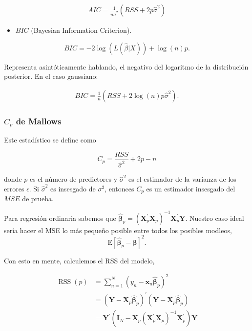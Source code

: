 \documentclass[
  12pt,
]{book}
\providecommand{\tightlist}{%
  \setlength{\itemsep}{0pt}\setlength{\parskip}{0pt}}
\theoremstyle{definition}
\theoremstyle{definition}
\theoremstyle{definition}
\theoremstyle{definition}
\theoremstyle{remark}
\begin{document}
\begin{align*}
AIC = \frac{1}{n\hat \sigma^2}(RSS+2p\hat \sigma^2)
\end{align*}

\begin{itemize}
\tightlist
\item
  \(BIC\) (Bayesian Information Criterion).
\end{itemize}

\[
BIC = -2\log(L(\hat{\beta} \vert X)) + \log(n)p. 
\]

Representa asintóticamente hablando, el negativo del logaritmo de la distribución posterior. En el caso gaussiano:

\begin{align*}
BIC = \frac{1}{n}(RSS+2\log (n)p\hat \sigma^2).
\end{align*}

\hypertarget{c_p-de-mallows-1}{%
\subsubsection{\texorpdfstring{\(C_p\) de Mallows}{C\_p de Mallows}}\label{c_p-de-mallows-1}}

Este estadístico se define como

\[ C_p = \dfrac{RSS}{\hat\sigma^2} + 2p-n \]

donde \(p\) es el número de predictores y \(\hat\sigma^2\) es el estimador de la varianza de los errores \(\epsilon\). Si \(\hat\sigma^2\) es insesgado de \(\sigma^2\), entonces \(C_p\) es un estimador insesgado del \(MSE\) de prueba.

Para regresión ordinaria sabemos que \(\hat{\boldsymbol{\beta}}_{p}=\left(\mathbf{X}_{p}^{\prime} \mathbf{X}_{p}\right)^{-1} \mathbf{X}_{p}^{\prime} \mathbf{Y}\). Nuestro caso ideal sería hacer el MSE lo más pequeño posible entre todos los posibles modleos,
\begin{equation*}
\mathrm{E}\left[\hat{\boldsymbol{\beta}}_{p}-\boldsymbol{\beta}\right]^{2}.
\end{equation*}

Con esto en mente, calculemos el RSS del modelo,

\begin{equation*}
\begin{aligned}
\operatorname{RSS}(p) &=\sum_{n=1}^{N}\left(y_{n}-\mathbf{x}_{n} \hat{\boldsymbol{\beta}}_{p}\right)^{2} \\
&=\left(\mathbf{Y}-\mathbf{X}_{p} \hat{\boldsymbol{\beta}}_{p}\right)^{\prime}\left(\mathbf{Y}-\mathbf{X}_{p} \hat{\boldsymbol{\beta}}_{p}\right) \\
&=\mathbf{Y}^{\prime}\left(\mathbf{I}_{N}-\mathbf{X}_{p}\left(\mathbf{X}_{p}^{\prime} \mathbf{X}_{p}\right)^{-1} \mathbf{X}_{p}^{\prime}\right) \mathbf{Y}
\end{aligned}
\end{equation*}
\end{document}
